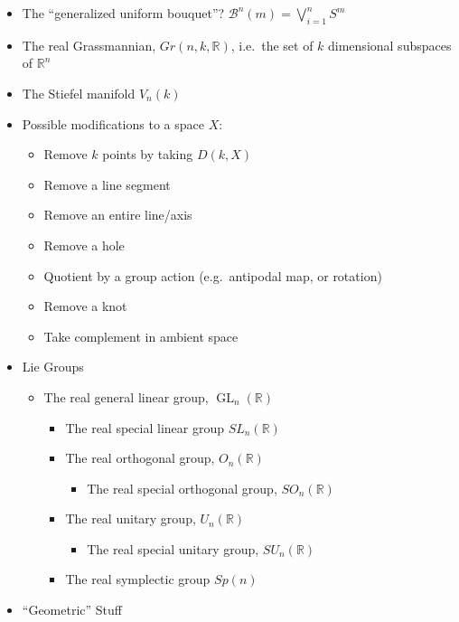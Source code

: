 \begin{itemize}
\item
  The ``generalized uniform bouquet''?
  \(\mathcal{B}^n(m) = \bigvee_{i=1}^n S^m\)
\item
  The real Grassmannian, \(Gr(n, k, {\mathbb{R}})\), i.e.~the set of
  \(k\) dimensional subspaces of \({\mathbb{R}}^n\)
\item
  The Stiefel manifold \(V_n(k)\)
\item
  Possible modifications to a space \(X\):

  \begin{itemize}
  \tightlist
  \item
    Remove \(k\) points by taking \(D(k, X)\)
  \item
    Remove a line segment
  \item
    Remove an entire line/axis
  \item
    Remove a hole
  \item
    Quotient by a group action (e.g.~antipodal map, or rotation)
  \item
    Remove a knot
  \item
    Take complement in ambient space
  \end{itemize}
\item
  Lie Groups

  \begin{itemize}
  \tightlist
  \item
    The real general linear group, \(\operatorname{GL}_n({\mathbb{R}})\)

    \begin{itemize}
    \tightlist
    \item
      The real special linear group \(SL_n({\mathbb{R}})\)
    \item
      The real orthogonal group, \(O_n({\mathbb{R}})\)

      \begin{itemize}
      \tightlist
      \item
        The real special orthogonal group, \(SO_n({\mathbb{R}})\)
      \end{itemize}
    \item
      The real unitary group, \(U_n({\mathbb{R}})\)

      \begin{itemize}
      \tightlist
      \item
        The real special unitary group, \(SU_n({\mathbb{R}})\)
      \end{itemize}
    \item
      The real symplectic group \(Sp(n)\)
    \end{itemize}
  \end{itemize}
\item
  ``Geometric'' Stuff


\end{itemize}
